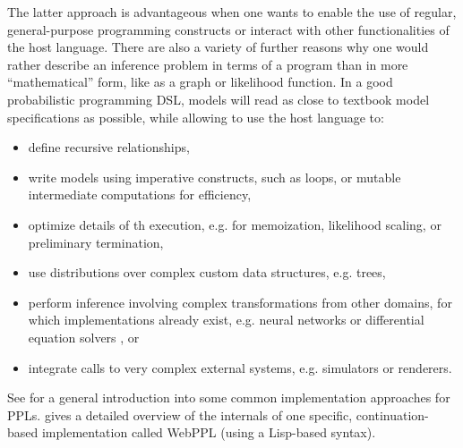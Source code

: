 The latter approach is advantageous when one wants to enable the use of regular, general-purpose
programming constructs or interact with other functionalities of the host language.  There are also
a variety of further reasons why one would rather describe an inference problem in terms of a
program than in more \enquote{mathematical} form, like as a graph or likelihood function.  In a good
probabilistic programming DSL, models will read as close to textbook model specifications as
possible, while allowing to use the host language to:
\begin{itemize}
  \firmlist
\item define recursive relationships,
\item write models using imperative constructs, such as loops, or mutable intermediate computations
  for efficiency,
\item optimize details of th execution, e.g. for memoization, likelihood scaling, or preliminary
  termination,
\item use distributions over complex custom data structures, e.g. trees,
\item perform inference involving complex transformations from other domains, for which
  implementations already exist, e.g. neural networks or differential equation solvers , or
\item integrate calls to very complex external systems, e.g. simulators or renderers.
\end{itemize}
See \textcite{vandemeent2018introduction} for a general introduction into some common implementation
approaches for PPLs. \Textcite{goodman2014design} gives a detailed overview of the internals of one
specific, continuation-based implementation called WebPPL (using a Lisp-based syntax).

